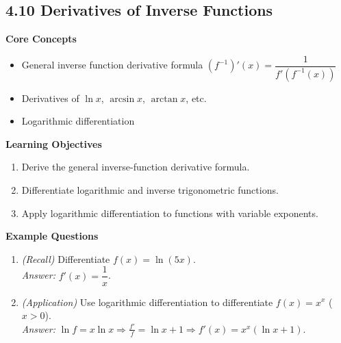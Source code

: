 \documentclass[11pt]{article}
\begin{document}
\subsection{4.10 Derivatives of Inverse Functions}
\textbf{Core Concepts}
\begin{itemize}
\item General inverse function derivative formula $\left(f^{-1}\right)'(x) = \dfrac{1}{f'(f^{-1}(x))}$
\item Derivatives of $\ln x$, $\arcsin x$, $\arctan x$, etc.
\item Logarithmic differentiation
\end{itemize}
\textbf{Learning Objectives}
\begin{enumerate}
\item Derive the general inverse-function derivative formula.
\item Differentiate logarithmic and inverse trigonometric functions.
\item Apply logarithmic differentiation to functions with variable exponents.
\end{enumerate}
\textbf{Example Questions}
\begin{enumerate}
\item \emph{(Recall)} Differentiate $f(x) = \ln(5x)$. \\
\textit{Answer:} $f'(x) = \dfrac{1}{x}$.
\item \emph{(Application)} Use logarithmic differentiation to differentiate $f(x) = x^{x}$ ($x>0$). \\
\textit{Answer:} $\ln f = x\ln x \Rightarrow \frac{f'}{f}=\ln x + 1 \Rightarrow f'(x) = x^x(\ln x+1)$.
\end{enumerate}
\end{document}

